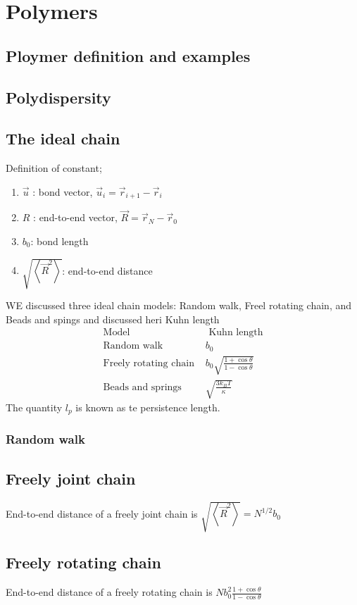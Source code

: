 \documentclass[12pt,a4paper]{article}
\begin{document}
\section{Polymers}
\subsection{Ploymer definition and examples}
\subsection{Polydispersity}
\subsection{The ideal chain}
Definition of constant;
\begin{enumerate}
    \item $\vec{u}$ : bond vector, $\vec{u}_i=\vec{r}_{i+1}-\vec{r}_i$
    \item $R$ : end-to-end vector, $\vec{R}=\vec{r}_N-\vec{r}_0$
    \item $b_0$: bond length
    \item $\sqrt{\left\langle\vec{R}^2\right\rangle}$: end-to-end distance 
\end{enumerate}
WE discussed three ideal chain models: Random walk, Freel rotating chain, and Beads and spings and discussed heri Kuhn length
$$
\begin{array}{ll}
    \hline \text { Model } & \text { Kuhn length } \\
    \hline \text { Random walk } & b_0 \\
    \text { Freely rotating chain } & b_0 \sqrt{\frac{1+\cos \theta}{1-\cos \theta}} \\
    \text { Beads and springs } & \sqrt{\frac{3 k_B T}{\kappa}}
\end{array}
$$
The quantity $l_p$ is known as te persistence length.
\subsubsection{Random walk}
\subsection{Freely joint chain}
End-to-end distance of a freely joint chain is $\sqrt{\left\langle\vec{R}^2\right\rangle}=N^{1 / 2} b_0$
\subsection{Freely rotating chain}
End-to-end distance of a freely rotating chain is $N b_0^2 \frac{1+\cos \theta}{1-\cos \theta}$
\end{document}
